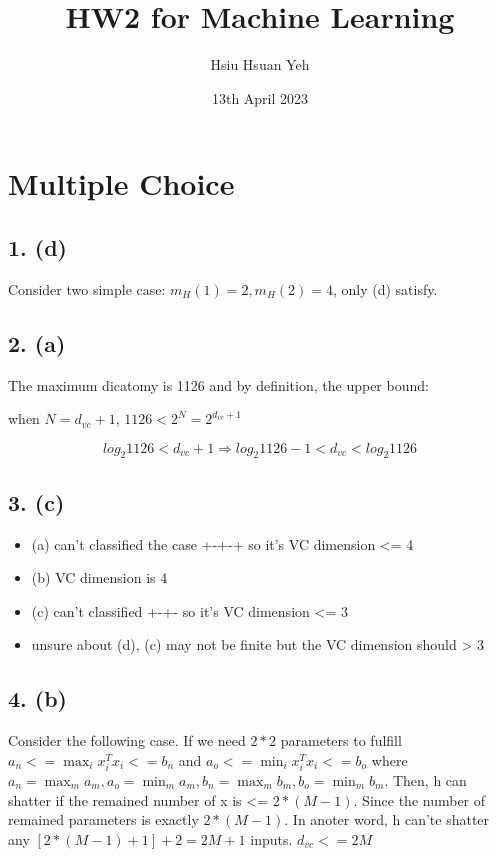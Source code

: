 \documentclass[12pt,a4paper]{article}
\title{ HW2 for Machine Learning }
\author{ Hsiu Hsuan Yeh }
\date{ 13th April 2023 }
\begin{document}
\maketitle

\section{Multiple Choice}
\subsection{1. (d)}
Consider two simple case: $m_H(1) = 2, m_H(2) = 4$, only (d) satisfy.

\subsection{2. (a)}
The maximum dicatomy is 1126 and by definition, the upper bound:

when $N = d_{vc} + 1$, $1126 < 2^N=2^{d_{vc}+1}$

\[
log_{2}1126 < d_{vc} + 1
\Rightarrow log_{2}1126 - 1 < d_{vc} < log_{2}1126
\]
\subsection{3. (c)}
\begin{itemize}
\item (a) can't classified the case +-+-+ so it's VC dimension <= 4


\item (b) VC dimension is 4


\item (c) can't classified +-+- so it's VC dimension <= 3


\item unsure about (d), (c) may not be finite but the VC dimension should > 3

\end{itemize}
\subsection{4. (b)}
Consider the following case. If we need $2*2$ parameters to fulfill $a_n <= \max_i{x_i^T x_i} <= b_n$  and $a_o <= \min_i{x_i^Tx_i} <= b_o$ where $a_n=\max_m{a_m}, a_o=\min_m{a_m}, b_n=\max_m{b_m}, b_o=\min_m{b_m}$. Then, h can shatter if the remained number of x is <= $2*(M-1)$. Since the number of remained parameters is exactly $2*(M-1)$. In anoter word, h can'te shatter any $[2*(M-1) + 1] + 2 = 2M +1 $ inputs. $d_{vc} <= 2M$
\end{document}
